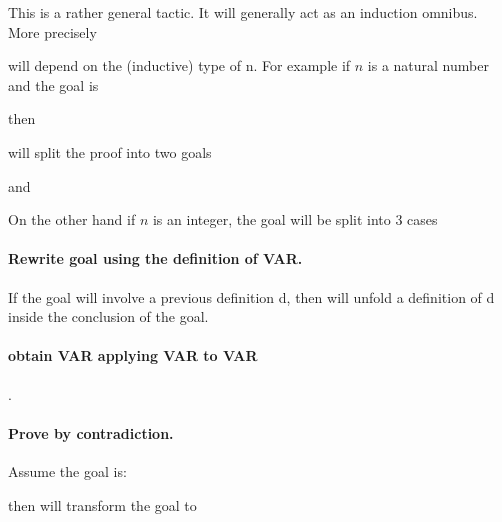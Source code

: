 This is a rather general tactic. It will generally act as an induction omnibus. More precisely

will depend on the (inductive) type of n. For example if $n$ is a natural number and the goal is

 then 

will split the proof into two goals
 
 and 
 
On the other hand if $n$ is an integer, the goal
will be split into 3 cases

 
 

\paragraph{\bf Rewrite goal using the definition of VAR.}
If the goal will involve a previous definition d, then
 will unfold a definition of d inside the conclusion of the goal.


\paragraph{\bf obtain VAR applying VAR to VAR}.

\paragraph{\bf Prove by contradiction.}

Assume the goal is:

 
 then  
  will transform the goal to
 


